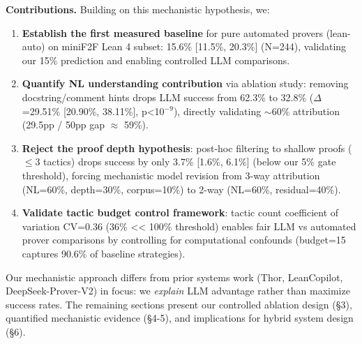 \textbf{Contributions.} Building on this mechanistic hypothesis, we:

\begin{enumerate}
\item \textbf{Establish the first measured baseline} for pure automated provers (lean-auto) on miniF2F Lean 4 subset: 15.6\% [11.5\%, 20.3\%] (N=244), validating our 15\% prediction and enabling controlled LLM comparisons.

\item \textbf{Quantify NL understanding contribution} via ablation study: removing docstring/comment hints drops LLM success from 62.3\% to 32.8\% ($\Delta$=29.51\% [20.90\%, 38.11\%], p<10$^{-9}$), directly validating $\sim$60\% attribution (29.5pp / 50pp gap $\approx$ 59\%).

\item \textbf{Reject the proof depth hypothesis}: post-hoc filtering to shallow proofs ($\leq$3 tactics) drops success by only 3.7\% [1.6\%, 6.1\%] (below our 5\% gate threshold), forcing mechanistic model revision from 3-way attribution (NL=60\%, depth=30\%, corpus=10\%) to 2-way (NL=60\%, residual=40\%).

\item \textbf{Validate tactic budget control framework}: tactic count coefficient of variation CV=0.36 (36\% << 100\% threshold) enables fair LLM vs automated prover comparisons by controlling for computational confounds (budget=15 captures 90.6\% of baseline strategies).
\end{enumerate}

Our mechanistic approach differs from prior systems work (Thor, LeanCopilot, DeepSeek-Prover-V2) in focus: we \emph{explain} LLM advantage rather than maximize success rates. The remaining sections present our controlled ablation design (\S3), quantified mechanistic evidence (\S4-5), and implications for hybrid system design (\S6).
